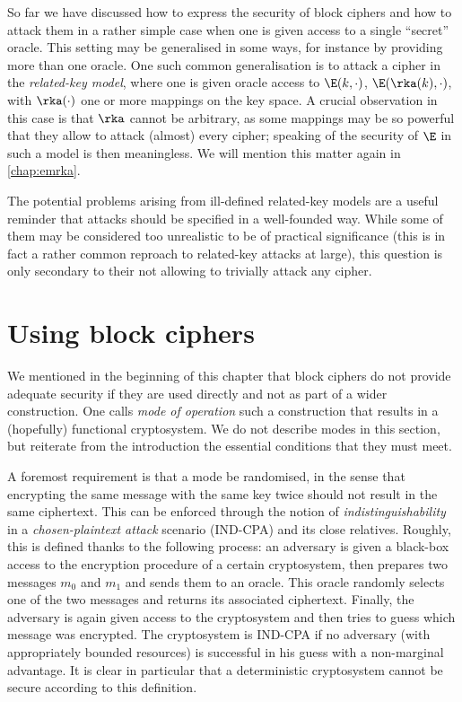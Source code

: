 So far we have discussed how to express the security of block ciphers and how to attack them in a rather simple case when one is given access to a single ``secret'' oracle. This setting may be generalised
in some ways, for instance by providing more than one oracle. One such common generalisation is to attack a cipher in the \emph{related-key model}, where one is given oracle access to
$\E(k,\cdot)$, $\E(\rka(k),\cdot)$, with $\rka(\cdot)$ one or more mappings on the key space. A crucial observation in this case is that $\rka$ cannot be arbitrary, as some mappings may
be so powerful that they allow to attack (almost) every cipher; speaking of the security of $\E$ in such a model is then meaningless. We will mention this matter again in \autoref{chap:emrka}.

The potential problems arising from ill-defined related-key models are a useful reminder that attacks should be specified in a well-founded way. While some of them may be
considered too unrealistic to be of practical significance (this is in fact a rather common reproach to related-key attacks at large), this question is only secondary to their not allowing to trivially
attack any cipher. 

\section{Using block ciphers}
\label{sec:bc_modes}

We mentioned in the beginning of this chapter that block ciphers do not provide adequate security if they are used directly and not as part of a wider construction. One calls \emph{mode
of operation} such a construction that results in a (hopefully) functional cryptosystem. We do not describe modes in this section, but reiterate from the introduction the essential conditions that they
must meet.

A foremost requirement is that a mode be randomised, in the sense that encrypting the same message with the same key twice should not result in the same ciphertext. This can be
enforced through the notion of \emph{indistinguishability} in a \emph{chosen-plaintext attack} scenario (\textsf{IND-CPA}) and its close relatives. Roughly, this is
defined thanks to the following process: an adversary is given a black-box access to the encryption procedure of a certain cryptosystem, then prepares two messages $m_0$ and $m_1$ and sends them to an oracle. This oracle randomly selects one of the two messages and
returns its associated ciphertext. Finally, the adversary is again given access to the cryptosystem and then tries to guess which message was encrypted. The cryptosystem is \textsf{IND-CPA}
if no adversary (with appropriately bounded resources) is successful in his guess with a non-marginal advantage. It is clear in particular that a deterministic cryptosystem cannot be secure according
to this definition.


